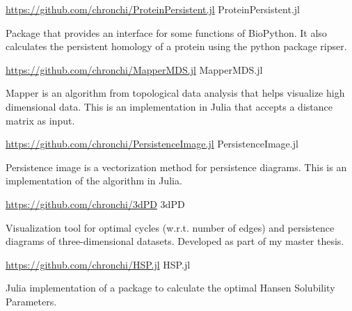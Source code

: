 \begin{cventries}
\cventry
  {\url{https://github.com/chronchi/ProteinPersistent.jl}} %
  {ProteinPersistent.jl} %
  {}{}
  {
    \begin{cvitems} %
      \item {Package that provides an interface for some functions of BioPython.
      It also calculates the persistent homology of a protein using the python
      package ripser.}
    \end{cvitems}
  }


\cventry
  {\url{https://github.com/chronchi/MapperMDS.jl}} %
  {MapperMDS.jl} %
  {}{}
  {
    \begin{cvitems} %
      \item {Mapper is an algorithm from topological data analysis that
      helps visualize high dimensional data. This is
      an implementation in Julia that accepts a distance matrix
      as input.}
    \end{cvitems}
  }

\cventry
  {\url{https://github.com/chronchi/PersistenceImage.jl}} %
  {PersistenceImage.jl} %
  {}{}
  {
    \begin{cvitems} %
      \item {Persistence image is a vectorization method for persistence
      diagrams. This is an implementation of the algorithm in Julia.}
    \end{cvitems}
  }

\cventry
  {\url{https://github.com/chronchi/3dPD}} %
  {3dPD} %
  {}{}
  {
    \begin{cvitems} %
        \item {Visualization tool for optimal cycles (w.r.t. number of edges) and persistence
	       diagrams of three-dimensional datasets. Developed as part of my master thesis.}
    \end{cvitems}
  }

\cventry
  {\url{https://github.com/chronchi/HSP.jl}} %
  {HSP.jl} %
  {}{}
  {
    \begin{cvitems} %
      \item {Julia implementation of a package to calculate the
      optimal Hansen Solubility Parameters.}
    \end{cvitems}
  }
\end{cventries}
